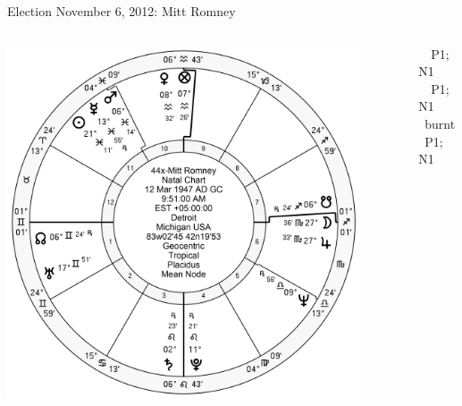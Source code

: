 \begin{frame}[t]{Election November 6, 2012: Mitt Romney}
\small
\begin{columns}[T, onlytextwidth]
\vspace{-1em}
{\includegraphics[width=0.9\textwidth]{charts/Romney.png}}
\fontsize{7pt}{8pt}\selectfont

\Mars\, \Trine\, P1; \Square\, N1 \\
\Sun\, \Trine\, P1; \Square\, N1 \\
\Mercury\, burnt \Trine\, P1; \Square\, N1



\end{columns}
\end{frame}

